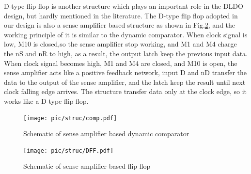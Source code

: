\documentclass[journal]{IEEEtran}
\begin{document}
D-type flip flop is another structure which plays an important role in the DLDO design, but hardly mentioned in the literature. The D-type flip flop adopted in our design is also a sense amplifier based structure as shown in Fig.\ref{fig:DFF}, and the working principle of it is similar to the dynamic comparator.  When clock signal is low, M10 is closed,so the sense amplifier stop working, and M1 and M4 charge the nS and nR to high, as a result, the output latch keep the previous input data. When clock signal becomes high, M1 and M4 are closed, and M10 is open, the sense amplifier acts like a positive feedback network, input D and nD transfer the data to the output of the sense amplifier, and the latch keep the result until next clock falling edge arrives. The structure transfer data only at the clock edge, so it works like a D-type flip flop.
\begin{figure}[t!]
    \centering
    \texttt{[image: pic/struc/comp.pdf]}
    \caption{Schematic of sense amplifier based dynamic comparator}
    \label{fig:comp}
\end{figure}
\begin{figure}[t!]
    \centering
    \texttt{[image: pic/struc/DFF.pdf]}
    \caption{Schematic of sense amplifier based flip flop}
    \label{fig:DFF}
\end{figure}
\end{document}
